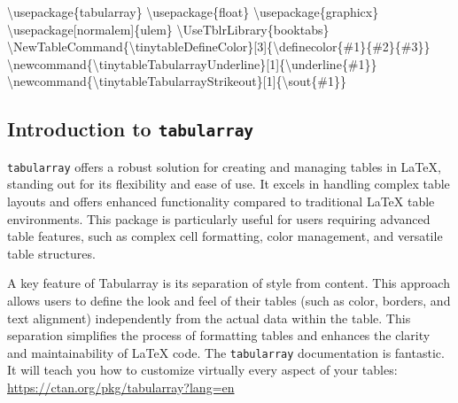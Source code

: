 \documentclass[
  letterpaper,
  DIV=11,
  numbers=noendperiod]{scrartcl}
\newenvironment{Shaded}{\begin{snugshade}}{\end{snugshade}}
\newcommand{\BuiltInTok}[1]{\textcolor[rgb]{0.00,0.23,0.31}{#1}}
\newcommand{\ExtensionTok}[1]{\textcolor[rgb]{0.00,0.23,0.31}{#1}}
\newcommand{\FunctionTok}[1]{\textcolor[rgb]{0.28,0.35,0.67}{#1}}
\newcommand{\NormalTok}[1]{\textcolor[rgb]{0.00,0.23,0.31}{#1}}
\begin{document}
\begin{Shaded}
\begin{Highlighting}[]
\BuiltInTok{\textbackslash{}usepackage}\NormalTok{\{}\ExtensionTok{tabularray}\NormalTok{\}}
\BuiltInTok{\textbackslash{}usepackage}\NormalTok{\{}\ExtensionTok{float}\NormalTok{\}}
\BuiltInTok{\textbackslash{}usepackage}\NormalTok{\{}\ExtensionTok{graphicx}\NormalTok{\}}
\BuiltInTok{\textbackslash{}usepackage}\NormalTok{[normalem]\{}\ExtensionTok{ulem}\NormalTok{\}}
\FunctionTok{\textbackslash{}UseTblrLibrary}\NormalTok{\{booktabs\}}
\FunctionTok{\textbackslash{}NewTableCommand}\NormalTok{\{}\FunctionTok{\textbackslash{}tinytableDefineColor}\NormalTok{\}[3]\{}\FunctionTok{\textbackslash{}definecolor}\NormalTok{\{\#1\}\{\#2\}\{\#3\}\}}
\FunctionTok{\textbackslash{}newcommand}\NormalTok{\{}\ExtensionTok{\textbackslash{}tinytableTabularrayUnderline}\NormalTok{\}[1]\{}\FunctionTok{\textbackslash{}underline}\NormalTok{\{\#1\}\}}
\FunctionTok{\textbackslash{}newcommand}\NormalTok{\{}\ExtensionTok{\textbackslash{}tinytableTabularrayStrikeout}\NormalTok{\}[1]\{}\FunctionTok{\textbackslash{}sout}\NormalTok{\{\#1\}\}}
\end{Highlighting}
\end{Shaded}

\subsection{\texorpdfstring{Introduction to
\texttt{tabularray}}{Introduction to tabularray}}\label{introduction-to-tabularray}

\texttt{tabularray} offers a robust solution for creating and managing
tables in LaTeX, standing out for its flexibility and ease of use. It
excels in handling complex table layouts and offers enhanced
functionality compared to traditional LaTeX table environments. This
package is particularly useful for users requiring advanced table
features, such as complex cell formatting, color management, and
versatile table structures.

A key feature of Tabularray is its separation of style from content.
This approach allows users to define the look and feel of their tables
(such as color, borders, and text alignment) independently from the
actual data within the table. This separation simplifies the process of
formatting tables and enhances the clarity and maintainability of LaTeX
code. The \texttt{tabularray} documentation is fantastic. It will teach
you how to customize virtually every aspect of your tables:
\url{https://ctan.org/pkg/tabularray?lang=en}
\end{document}
